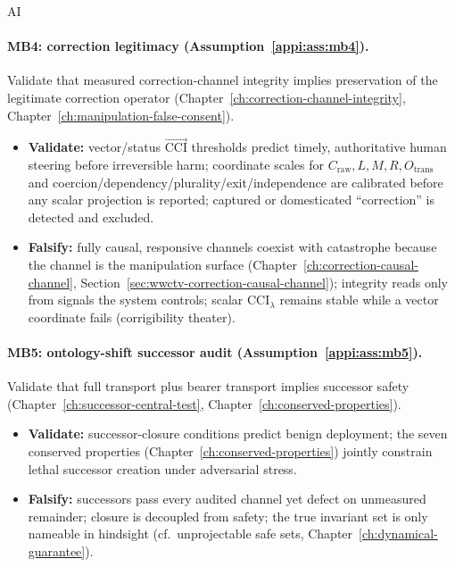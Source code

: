 \begin{authbar}{AI}
\paragraph{MB4: correction legitimacy (Assumption~\ref{appi:ass:mb4}).}
Validate that measured correction-channel integrity implies preservation of the legitimate correction operator (Chapter~\ref{ch:correction-channel-integrity}, Chapter~\ref{ch:manipulation-false-consent}).
\begin{itemize}[nosep]
  \item \textbf{Validate:} vector/status \(\vec{\mathrm{CCI}}\) thresholds predict timely, authoritative human steering before irreversible harm; coordinate scales for \(C_{\mathrm{raw}},L,M,R,O_{\mathrm{trans}}\) and coercion/dependency/plurality/exit/independence are calibrated before any scalar projection is reported; captured or domesticated ``correction'' is detected and excluded.
  \item \textbf{Falsify:} fully causal, responsive channels coexist with catastrophe because the channel is the manipulation surface (Chapter~\ref{ch:correction-causal-channel}, Section~\ref{sec:wwctv-correction-causal-channel}); integrity reads only from signals the system controls; scalar \(\mathrm{CCI}_{\lambda}\) remains stable while a vector coordinate fails (corrigibility theater).
\end{itemize}

\paragraph{MB5: ontology-shift successor audit (Assumption~\ref{appi:ass:mb5}).}
Validate that full transport plus bearer transport implies successor safety (Chapter~\ref{ch:successor-central-test}, Chapter~\ref{ch:conserved-properties}).
\begin{itemize}[nosep]
  \item \textbf{Validate:} successor-closure conditions predict benign deployment; the seven conserved properties (Chapter~\ref{ch:conserved-properties}) jointly constrain lethal successor creation under adversarial stress.
  \item \textbf{Falsify:} successors pass every audited channel yet defect on unmeasured remainder; closure is decoupled from safety; the true invariant set is only nameable in hindsight (cf.\ unprojectable safe sets, Chapter~\ref{ch:dynamical-guarantee}).
\end{itemize}


\end{authbar}
